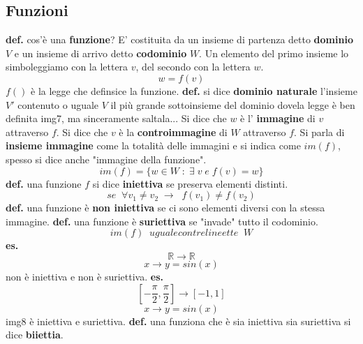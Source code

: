 \subsection*{Funzioni}
\textbf{def.} cos'è una \textbf{funzione}?
\newline
E' costituita da un insieme di partenza detto \textbf{dominio} $V$ e un insieme di arrivo detto \textbf{codominio} $W$. Un elemento del primo insieme lo simboleggiamo con la lettera $v$, del secondo con la lettera $w$.
\newline
\[
    w = f(v)
\]
$f()$ è la legge che definsice la funzione.
\newline
\textbf{def.} si dice \textbf{dominio naturale} l'insieme $V'$ contenuto o uguale $V$ il più grande sottoinsieme del dominio dovela legge è ben definita
\newline
img7, ma sinceramente saltala...
\newline
Si dice che $w$ è l' \textbf{immagine} di $v$ attraverso $f$.
\newline
Si dice che $v$ è la \textbf{controimmagine} di $W$ attraverso $f$.
\newline
Si parla di \textbf{insieme immagine} come la totalità delle immagini e si indica come $im(f)$, spesso si dice anche "immagine della funzione".
\[
    im(f) = \{w \in W \;:\; \exists \; v \;e\; f(v) = w\}
\]
\textbf{def.} una funzione $f$ si dice \textbf{iniettiva} se preserva elementi distinti.
\[
    se \;\; \forall v_1 \neq v_2 \;\rightarrow\;\; f(v_1) \neq f(v_2)
\]
\textbf{def.} una funzione è \textbf{non iniettiva} se ci sono elementi diversi con la stessa immagine.
\newline
\textbf{def.} una funzione è \textbf{suriettiva} se "invade" tutto il codominio.
\[
    im(f) \;\; ugualecontrelineette \;\; W
\] 
\textbf{es.} 
\[
    \mathbb{R} \rightarrow \mathbb{R}
\]
\[
    x \rightarrow y=sin(x)
\]
non è iniettiva e non è suriettiva.
\newline
\textbf{es.} 
\[
    [-\frac{\pi}{2}, \frac{\pi}{2} ] \rightarrow [-1,1]
\]
\[
    x\rightarrow y=sin(x)
\]
img8
\newline
è iniettiva e suriettiva.
\newline
\textbf{def.} una funziona che è sia iniettiva sia suriettiva si dice \textbf{biiettia}.
\newline
